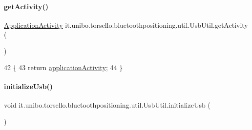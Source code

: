 \paragraph{\texorpdfstring{get\+Activity()}{getActivity()}}
{\footnotesize\ttfamily \hyperlink{classit_1_1unibo_1_1torsello_1_1bluetoothpositioning_1_1activities_1_1ApplicationActivity}{Application\+Activity} it.\+unibo.\+torsello.\+bluetoothpositioning.\+util.\+Usb\+Util.\+get\+Activity (\begin{DoxyParamCaption}{ }\end{DoxyParamCaption})\hspace{0.3cm}{\ttfamily [private]}}


\begin{DoxyCode}
42                                               \{
43         \textcolor{keywordflow}{return} \hyperlink{classit_1_1unibo_1_1torsello_1_1bluetoothpositioning_1_1util_1_1UsbUtil_afdcd78c04f043fafe29eb2cc006b5843_afdcd78c04f043fafe29eb2cc006b5843}{applicationActivity};
44     \}
\end{DoxyCode}
\hypertarget{classit_1_1unibo_1_1torsello_1_1bluetoothpositioning_1_1util_1_1UsbUtil_a12b05cc1420c35ea8072d16253ab362e_a12b05cc1420c35ea8072d16253ab362e}{}\label{classit_1_1unibo_1_1torsello_1_1bluetoothpositioning_1_1util_1_1UsbUtil_a12b05cc1420c35ea8072d16253ab362e_a12b05cc1420c35ea8072d16253ab362e} 
\paragraph{\texorpdfstring{initialize\+Usb()}{initializeUsb()}}
{\footnotesize\ttfamily void it.\+unibo.\+torsello.\+bluetoothpositioning.\+util.\+Usb\+Util.\+initialize\+Usb (\begin{DoxyParamCaption}{ }\end{DoxyParamCaption})\hspace{0.3cm}{\ttfamily [private]}}


